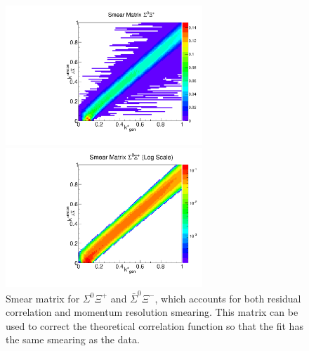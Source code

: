 \begin{figure}[ht]
\begin{minipage}{17.5pc}
\includegraphics[width=17.5pc]{Figures/SmearMatrices/2016-7-19-SmearMatrixSigmaXiCNormLA.pdf}
\end{minipage}\hspace{0.5pc}
\begin{minipage}{17.5pc}
\includegraphics[width=17.5pc]{Figures/SmearMatrices/2016-7-19-SmearMatrixSigmaXiCNormLALog.pdf}
\end{minipage} 
\caption[Smear matrix -- $\Sigma^0\Xi^{+}$ and $\bar{\Sigma}^0\Xi^{-}$]{
Smear matrix for $\Sigma^0\Xi^{+}$ and $\bar{\Sigma}^0\Xi^{-}$, which accounts for both residual correlation and momentum resolution smearing. This matrix can be used to correct the theoretical correlation function so that the fit has the same smearing as the data.
}
\end{figure}

